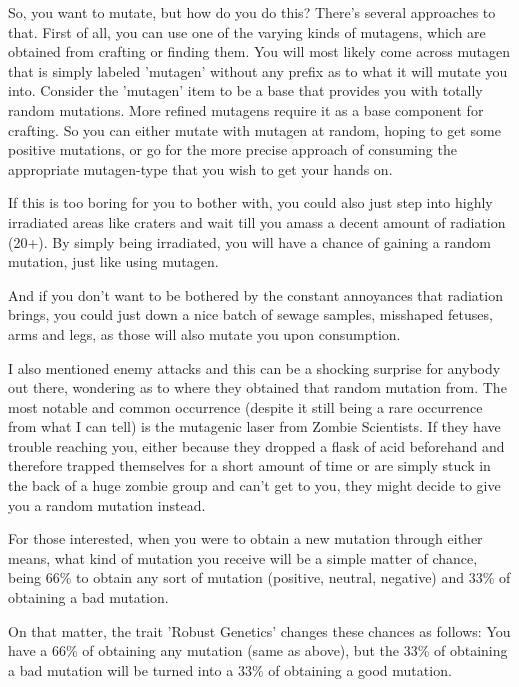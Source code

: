 \documentclass[11pt]{report}
\begin{document}
So, you want to mutate, but how do you do this?
There's several approaches to that. First of all, you can use one of the varying kinds of mutagens, which are obtained from crafting or finding them. You will most likely come across mutagen that is simply labeled 'mutagen' without any prefix as to what it will mutate you into. Consider the 'mutagen' item to be a base that provides you with totally random mutations. More refined mutagens require it as a base component for crafting. So you can either mutate with mutagen at random, hoping to get some positive mutations, or go for the more precise approach of consuming the appropriate mutagen-type that you wish to get your hands on.

If this is too boring for you to bother with, you could also just step into highly irradiated areas like craters and wait till you amass a decent amount of radiation (20+). By simply being irradiated, you will have a chance of gaining a random mutation, just like using mutagen.

And if you don't want to be bothered by the constant annoyances that radiation brings, you could just down a nice batch of sewage samples, misshaped fetuses, arms and legs, as those will also mutate you upon consumption.

I also mentioned enemy attacks and this can be a shocking surprise for anybody out there, wondering as to where they obtained that random mutation from. The most notable and common occurrence (despite it still being a rare occurrence from what I can tell) is the mutagenic laser from Zombie Scientists. If they have trouble reaching you, either because they dropped a flask of acid beforehand and therefore trapped themselves for a short amount of time or are simply stuck in the back of a huge zombie group and can't get to you, they might decide to give you a random mutation instead.

For those interested, when you were to obtain a new mutation through either means, what kind of mutation you receive will be a simple matter of chance, being 66\% to obtain any sort of mutation (positive, neutral, negative) and 33\% of obtaining a bad mutation.

On that matter, the trait 'Robust Genetics' changes these chances as follows: You have a 66\% of obtaining any mutation (same as above), but the 33\% of obtaining a bad mutation will be turned into a 33\% of obtaining a good mutation.
\end{document}
